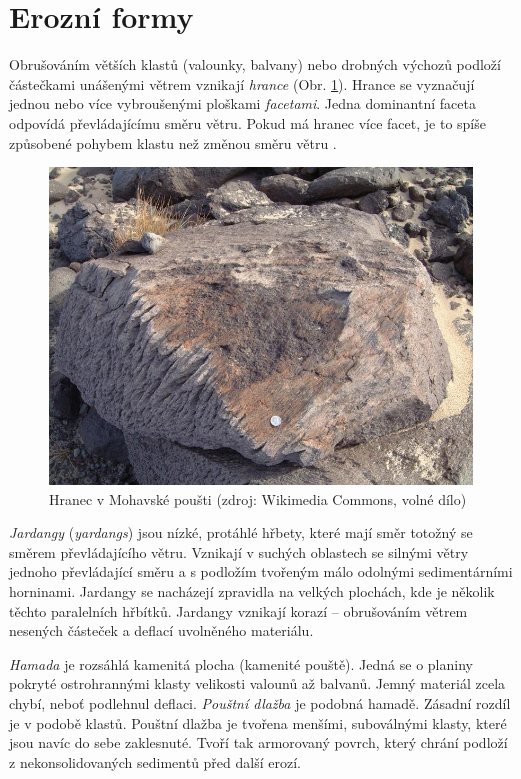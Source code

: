 \section{Erozní formy}
Obrušováním větších klastů (valounky, balvany) nebo drobných výchozů podloží částečkami unášenými větrem vznikají \emph{hrance} (Obr. \ref{fig:hranec}). Hrance se vyznačují jednou nebo více vybroušenými ploškami \emph{facetami}. Jedna dominantní faceta odpovídá převládajícímu směru větru. Pokud má hranec více facet, je to spíše způsobené pohybem klastu než změnou směru větru \parencite{livingstoneAeolianGeomorphologyNew2019}.
\begin{figure}
	\centering
	\includegraphics[width=1\linewidth]{obrazky/eolicka/ventifact_mojave}
	\caption{Hranec v Mohavské poušti (zdroj: Wikimedia Commons, volné dílo)}
	\label{fig:hranec}
\end{figure}

\emph{Jardangy} (\textit{yardangs}) jsou nízké, protáhlé hřbety, které mají směr totožný se směrem převládajícího větru. Vznikají v suchých oblastech se silnými větry jednoho převládající směru a s podložím tvořeným málo odolnými sedimentárními horninami. Jardangy se nacházejí zpravidla na velkých plochách, kde je několik těchto paralelních hřbítků. Jardangy vznikají korazí -- obrušováním větrem nesených částeček a deflací uvolněného materiálu. 

\emph{Hamada} je rozsáhlá kamenitá plocha (kamenité pouště). Jedná se o planiny pokryté ostrohrannými klasty velikosti valounů až balvanů. Jemný materiál zcela chybí, neboť podlehnul deflaci. \emph{Pouštní dlažba} je podobná hamadě. Zásadní rozdíl je v podobě klastů. Pouštní dlažba je tvořena menšími, suboválnými klasty, které jsou navíc do sebe zaklesnuté. Tvoří tak armorovaný povrch, který chrání podloží z nekonsolidovaných sedimentů před další erozí. 

